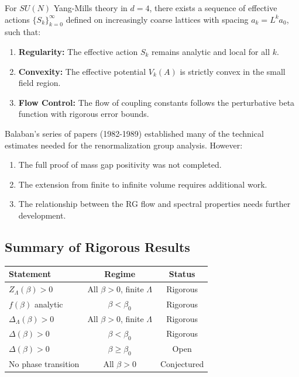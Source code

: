 \begin{theorem}
\label{thm:balaban-statement}
For $SU(N)$ Yang-Mills theory in $d=4$, there exists a sequence of effective actions $\{S_k\}_{k=0}^{\infty}$ defined on increasingly coarse lattices with spacing $a_k = L^k a_0$, such that:
\begin{enumerate}
    \item \textbf{Regularity:} The effective action $S_k$ remains analytic and local for all $k$.
    \item \textbf{Convexity:} The effective potential $V_k(A)$ is strictly convex in the small field region.
    \item \textbf{Flow Control:} The flow of coupling constants follows the perturbative beta function with rigorous error bounds.
\end{enumerate}
\end{theorem}

\begin{remark}
Balaban's series of papers (1982-1989) established many of the technical estimates needed for the renormalization group analysis. However:
\begin{enumerate}
    \item The full proof of mass gap positivity was not completed.
    \item The extension from finite to infinite volume requires additional work.
    \item The relationship between the RG flow and spectral properties needs further development.
\end{enumerate}
\end{remark}

\subsection{Summary of Rigorous Results}

\begin{center}
\begin{tabular}{|l|c|c|}
\hline
\textbf{Statement} & \textbf{Regime} & \textbf{Status} \\
\hline
$Z_\Lambda(\beta) > 0$ & All $\beta > 0$, finite $\Lambda$ & Rigorous \\
$f(\beta)$ analytic & $\beta < \beta_0$ & Rigorous \\
$\Delta_\Lambda(\beta) > 0$ & All $\beta > 0$, finite $\Lambda$ & Rigorous \\
$\Delta(\beta) > 0$ & $\beta < \beta_0$ & Rigorous \\
$\Delta(\beta) > 0$ & $\beta \geq \beta_0$ & Open \\
No phase transition & All $\beta > 0$ & Conjectured \\
\hline
\end{tabular}
\end{center}


